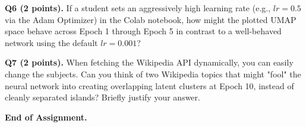 \documentclass[11pt]{article}
\begin{document}
\vspace{4cm}

\textbf{Q6 (2 points).} If a student sets an aggressively high learning rate (e.g., $lr=0.5$ via the Adam Optimizer) in the Colab notebook, how might the plotted UMAP space behave across Epoch 1 through Epoch 5 in contrast to a well-behaved network using the default $lr=0.001$? 

\vspace{4cm}

\textbf{Q7 (2 points).} When fetching the Wikipedia API dynamically, you can easily change the subjects. Can you think of two Wikipedia topics that might "fool" the neural network into creating overlapping latent clusters at Epoch 10, instead of cleanly separated islands? Briefly justify your answer.

\vspace{4cm}

\begin{center}
\textbf{End of Assignment.} 
\end{center}
\end{document}
